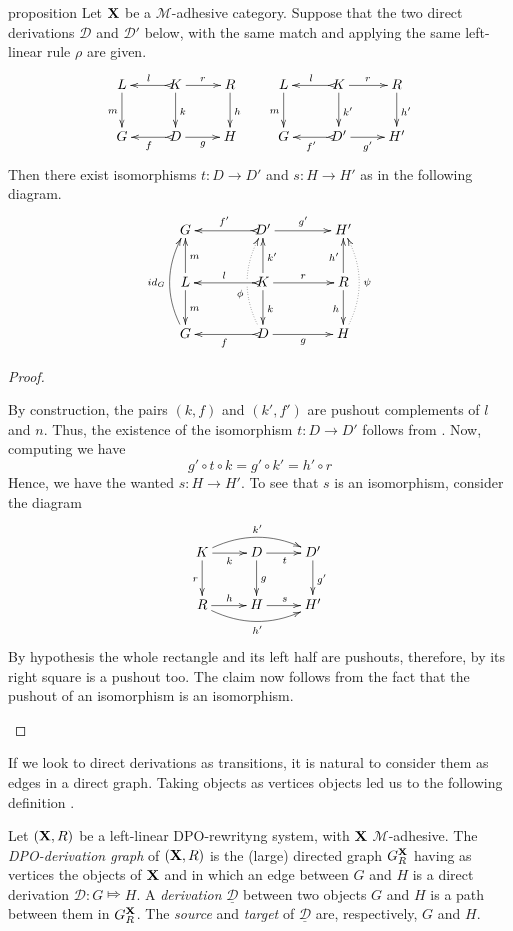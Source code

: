 \documentclass[a4paper,UKenglish,cleveref,pdftex, thm-restate,numberwithinsect]{lipics}
\newcommand{\id}[1]{\mathsf{id}_{#1}}
\def\R{\mathsf{R}}
\def\X{\textbf {\textup{X}}}
\newcommand{\dder}[1]{\mathscr{#1}}
\newcommand{\der}[1]{\underline{\dder{#1}}}
\def\gpo{\mathsf{G}^{\X}_R}
\begin{document}
\begin{theoremEnd}[category=sec2]{proposition}\label{prop:unique} Let $\X$  be a $\mathcal{M}$-adhesive category. Suppose that the two direct derivations $\mathscr{D}$ and $\mathscr{D'}$ below, with the same match and applying the same left-linear rule $\rho$ are given.
	\[\xymatrix{L \ar[d]_{m}& K \ar[d]^{k}\ar@{>->}[l]_{l} \ar[r]^{r} & R \ar[d]^{h} & L \ar[d]_{m}& K \ar[d]^{k'}\ar@{>->}[l]_{l} \ar[r]^{r} & R \ar[d]^{h'}\\G & \ar@{>->}[l]^{f} D \ar[r]_{g}& H & G & \ar@{>->}[l]^{f'} D' \ar[r]_{g'}& H'}\]
	Then there exist isomorphisms $t\colon D\to D'$ and $s\colon H\to H'$ as in the following diagram.
	\[\xymatrix@C=40pt{G&D' \ar[r]^{g'} \ar@{>->}[l]_{f'}&H'\\ L \ar[d]^{m} \ar[u]_{m} & K \ar[u]_{k'} \ar[d]^{k}\ar[r]^{r} \ar@{>->}[l]_{l} &R\ar[u]^{h'} \ar[d]_{h}\\G\ar@/^.4cm/[uu]^{\id{G}}&D\ar@{>->}[l]^{f}\ar@/^.4cm/@{.>}[uu]^(.4){\phi}|\hole \ar[r]_{g}&H\ar@/_.4cm/@{.>}[uu]_{\psi}}\]
\end{theoremEnd}
\begin{proof}\begin{proofEnd}
	By construction, the pairs $(k, f)$ and $(k', f')$ are pushout complements of $l$ and $n$. Thus, the existence of the isomorphism $t\colon D\to D'$ follows from . Now, computing we have
\[
g'\circ t \circ k= g' \circ k'=h'\circ r\]
	Hence, we have the wanted $s\colon H\to H'$. To see that $s$ is an isomorphism, consider the diagram 
	\[\xymatrix{K  \ar@/^.4cm/[rr]^{k'}\ar[d]_{r} \ar[r]_{k}& \ar[r]_{t} D \ar[d]^{g}& D' \ar[d]^{g'}\\ R \ar@/_.4cm/[rr]_{h'} \ar[r]^{h}& H \ar[r]^{s}& H'}\]
	By hypothesis the whole rectangle and its left half are pushouts, therefore, by  its right square is a pushout too. The claim now follows from the fact that the pushout of an isomorphism is an isomorphism.
	\end{proofEnd}
\end{proof}



If we look to direct derivations as transitions, it is natural to consider them as edges in a direct graph. Taking objects as vertices objects led us to the following definition \cite{heindel2009category}.

\begin{definition}
	Let $(\X, \R)$ be a left-linear DPO-rewrityng system, with $\X$ $\mathcal{M}$-adhesive. The \emph{DPO-derivation graph} of $(\X, \R)$ is the (large)  directed graph $\gpo$ having as vertices the objects of $\X$ and in which an edge between $G$ and $H$ is a direct derivation $\dder{D}\colon G\Mapsto H$.	A \emph{derivation} $\der{D}$ between two objects $G$ and $H$ is a path between them in $\gpo$. The \emph{source} and \emph{target} of $\der{D}$ are, respectively, $G$ and $H$.
\end{definition}
\end{document}
